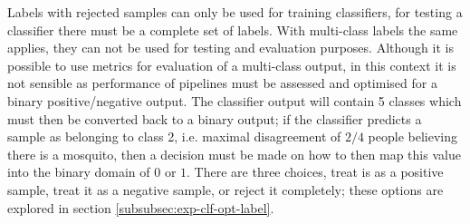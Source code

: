         
        Labels with rejected samples can only be used for training classifiers, for testing a classifier there must be a complete set of labels. With multi-class labels the same applies, they can not be used for testing and evaluation purposes. Although it is possible to use metrics for evaluation of a multi-class output, in this context it is not sensible as performance of pipelines must be assessed and optimised for a binary positive/negative output. The classifier output will contain 5 classes which must then be converted back to a binary output; if the classifier predicts a sample as belonging to class 2, i.e. maximal disagreement of $2/4$ people believing there is a mosquito, then a decision must be made on how to then map this value into the binary domain of $0$ or $1$. There are three choices, treat is as a positive sample, treat it as a negative sample, or reject it completely; these options are explored in section \ref{subsubsec:exp-clf-opt-label}. 